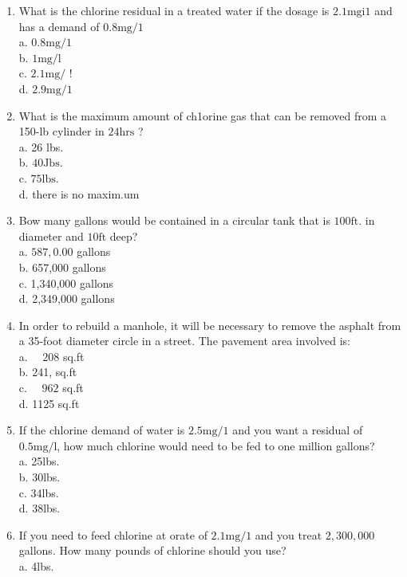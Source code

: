 \begin{enumerate}
\item What is the chlorine residual in a treated water if the dosage is $2.1 \mathrm{mgi} 1$ and has a demand of $0.8 \mathrm{mg} / 1$\\
a. $0.8 \mathrm{mg} / 1$\\
b. $1 \mathrm{mg} / \mathrm{l}$\\
c. $2.1 \mathrm{mg} /$ !\\
d. $2.9 \mathrm{mg} / 1$\\
\item What is the maximum amount of ch1orine gas that can be removed from a 150-lb cylinder in $24 \mathrm{hrs}$ ?\\
a. 26 lbs.\\
b. $40 \mathrm{Jbs}$.\\
c. $75 \mathrm{lbs}$.\\
d. there is no maxim.um\\
\item Bow many gallons would be contained in a circular tank that is $100 \mathrm{ft}$. in diameter and $10 \mathrm{ft}$ deep?\\
a. $587,0.00$ gallons\\
b. 657,000 gallons\\
c. 1,340,000 gallons\\
d. 2,349,000 gallons\\
\item In order to rebuild a manhole, it will be necessary to remove the asphalt from a 35-foot diameter circle in a street. The pavement area involved is:\\
a. $\quad 208$ sq.ft\\
b. 241, sq.ft\\
c. $\quad 962$ sq.ft\\
d. 1125 sq.ft\\
\item If the chlorine demand of water is $2.5 \mathrm{mg} / 1$ and you want a residual of $0.5 \mathrm{mg} / \mathrm{l}$, how much chlorine would need to be fed to one million gallons?\\
a. 25lbs.\\
b. 30lbs.\\
c. 34lbs.\\
d. 38lbs.\\
\item If you need to feed chlorine at orate of $2.1 \mathrm{mg} / 1$ and you treat $2,300,000$ gallons. How many pounds of chlorine should you use?\\
a. 4lbs.\\

\end{enumerate}
